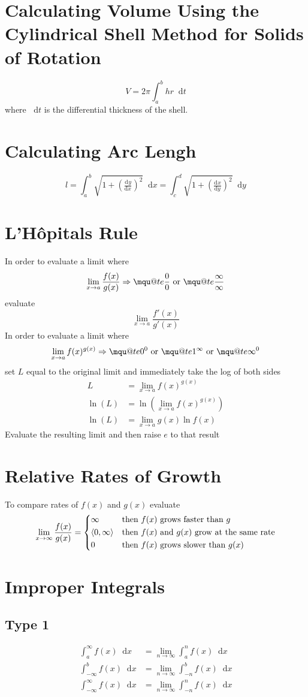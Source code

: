 \documentclass[12pt]{article}
\makeatletter
\renewcommand*{\implies}{\Rightarrow}
\newcommand*{\rmaskip}{\setlength{\abovedisplayskip}{0pt}}
\newcommand*{\rmbskip}{\setlength{\belowdisplayskip}{0pt}}
\newcommand*{\rmskip}{\rmaskip \rmbskip}
\newcommand*{\dd}[3][]{\tfrac{\mathrm{d}^{#1}#2}{\mathrm{d}#3^{#1}}}
\newcommand*{\D}[1]{\mathop{}\!\mathrm{d} #1}
\newcommand{\mquote}[1]{{\mathpalette\mqu@te{#1}}}
\newcommand{\mqu@te}[2]{%
  \sbox0{\(\m@th#1\text{``}\)}%
  \sbox1{\(\m@th#1\text{''}\)}%
  \sbox2{\(\m@th#1#2\)}%
  \ifdim\ht2>\ht0
    \raisebox{\dimexpr\ht2-\height}{\box0}%
    #2%
    \raisebox{\dimexpr\ht2-\height}{\box1}%
  \else
    \box0 #2\box1
  \fi
}
\makeatother
\begin{document}
\section*{Calculating Volume Using the Cylindrical Shell Method for Solids of
Rotation}
\[
  V = 2\pi \int_a^b hr \D{t}
\]
where \(\D{t}\) is the differential thickness of the shell.
\section*{Calculating Arc Lengh}
\[
  l = \int_a^b \sqrt{1+\left(\dd{y}{x}\right)^2} \D{x}
    = \int_c^d \sqrt{1+\left(\dd{x}{y}\right)^2} \D{y}
\]
\section*{L'H\^{o}pitals Rule}
In order to evaluate a limit where
\[
  \lim_{x \to a} \frac{f(x)}{g(x)} \implies \mquote{\frac{0}{0}} \text{ or }
  \mquote{\frac{\infty}{\infty}}
\]
evaluate
\[
  \lim_{x \to a} \frac{f'(x)}{g'(x)}
\]
In order to evaluate a limit where
\[
  \lim_{x \to a} f(x)^{g(x)} \implies \mquote{0^0} \text{ or }
  \mquote{1^\infty} \text{ or } \mquote{\infty^0}
\]
set \(L\) equal to the original limit and immediately take the log of both
sides
\begin{align*}
  L &= \lim_{x \to a} f(x)^{g(x)}\\
  \ln(L) &= \ln(\lim_{x \to a} f(x)^{g(x)})\\
  \ln(L) &= \lim_{x \to a} g(x) \ln f(x)
\end{align*}
Evaluate the resulting limit and then raise \(e\) to that result
\section*{Relative Rates of Growth}
To compare rates of \(f(x)\) and \(g(x)\) evaluate
\[
  \lim_{x \to \infty} \frac{f(x)}{g(x)} =
  \begin{dcases*}
    \infty & then \(f(x)\) grows faster than \(g\)\\
    \left<0, \infty\right> & then \(f(x)\) and \(g(x)\) grow at the same rate\\
    0 & then \(f(x)\) grows slower than \(g(x)\)
  \end{dcases*}
\]
\section*{Improper Integrals}
\subsection*{Type 1}
{\rmskip\begin{align*}
  \int_a^\infty f(x) \D{x} &= \lim_{n \to \infty} \int_a^n f(x) \D{x}\\
  \int_{-\infty}^b f(x) \D{x} &= \lim_{n \to \infty} \int_{-n}^b f(x) \D{x}\\
  \int_{-\infty}^\infty f(x) \D{x} &= \lim_{n \to \infty} \int_{-n}^n f(x) \D{x}
\end{align*}}%
\end{document}
